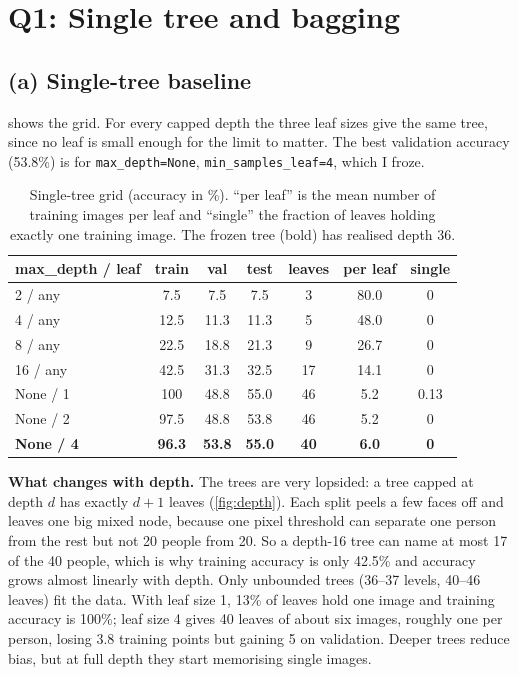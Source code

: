 \documentclass[10pt,twocolumn,letterpaper]{article}
\newcommand{\pct}[1]{#1\%}
\begin{document}
\section{Q1: Single tree and bagging}
\subsection{(a) Single-tree baseline}
 shows the grid. For every capped depth the three leaf sizes
give the same tree, since no leaf is small enough for the limit to matter. The
best validation accuracy (\pct{53.8}) is for \texttt{max\_depth=None},
\texttt{min\_samples\_leaf=4}, which I froze.

\begin{table}[t]
\centering\small
\begin{tabular}{lcccccc}
\toprule
max\_depth / leaf & train & val & test & leaves & per leaf & single\\
\midrule
2 / any        & 7.5  & 7.5  & 7.5  & 3  & 80.0 & 0\\
4 / any        & 12.5 & 11.3 & 11.3 & 5  & 48.0 & 0\\
8 / any        & 22.5 & 18.8 & 21.3 & 9  & 26.7 & 0\\
16 / any       & 42.5 & 31.3 & 32.5 & 17 & 14.1 & 0\\
None / 1       & 100  & 48.8 & 55.0 & 46 & 5.2  & 0.13\\
None / 2       & 97.5 & 48.8 & 53.8 & 46 & 5.2  & 0\\
\textbf{None / 4} & \textbf{96.3} & \textbf{53.8} & \textbf{55.0} & \textbf{40} & \textbf{6.0} & \textbf{0}\\
\bottomrule
\end{tabular}
\caption{Single-tree grid (accuracy in \%). ``per leaf'' is the mean number of
training images per leaf and ``single'' the fraction of leaves holding exactly
one training image. The frozen tree (bold) has realised depth 36.}
\label{tab:tree}
\end{table}

\textbf{What changes with depth.} The trees are very lopsided: a tree capped at
depth $d$ has exactly $d+1$ leaves (\cref{fig:depth}). Each split peels a few
faces off and leaves one big mixed node, because one pixel threshold can
separate one person from the rest but not 20 people from 20. So a depth-16 tree
can name at most 17 of the 40 people, which is why training accuracy is only
\pct{42.5} and accuracy grows almost linearly with depth. Only unbounded trees
(36--37 levels, 40--46 leaves) fit the data. With leaf size 1, 13\% of leaves
hold one image and training accuracy is \pct{100}; leaf size 4 gives 40 leaves
of about six images, roughly one per person, losing 3.8 training points but
gaining 5 on validation. Deeper trees reduce bias, but at full depth they start
memorising single images.
\end{document}
